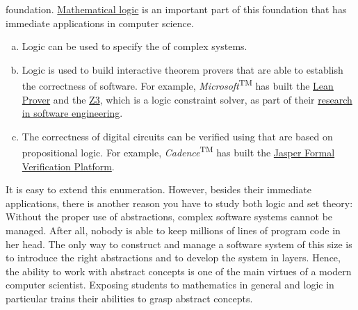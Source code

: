 foundation.  \href{https://en.wikipedia.org/wiki/Mathematical_logic}{Mathematical logic} 
is an important part of this foundation that has immediate applications in computer science. 
\begin{enumerate}[(a)]
\item Logic can be used to specify the  of complex systems.  
\item Logic is used to build interactive theorem provers that are able to establish the correctness of
      software.  For example, \textsl{Microsoft}\textsuperscript{TM} has built the
      \href{https://leanprover.github.io}{Lean Prover} and the
      \href{https://www.microsoft.com/en-us/research/project/z3-3/}{Z3}, which is a logic constraint solver, as
      part of their 
      \href{https://www.microsoft.com/en-us/research/group/research-software-engineering-rise/}{research in
        software engineering}. 
\item The correctness of digital circuits can be verified using  that are based on
      propositional logic.  For example, \textsl{Cadence}\textsuperscript{TM} has built the
      \href{https://www.cadence.com/en_US/home/tools/system-design-and-verification/formal-and-static-verification.html}{Jasper
        Formal Verification Platform}.
\end{enumerate}
It is easy to extend this enumeration.  However, besides their immediate applications, 
there is another reason you have to study both logic and set theory: Without the proper use of
{\color{blue}abstractions}, complex software systems cannot be managed.  After all, nobody is able to keep
millions of lines of program code in her head.  The only way to construct and manage a software system of this
size is to introduce the right abstractions and to develop the system in layers.  Hence, the ability
to work with abstract concepts is one of the main virtues of a modern computer scientist.  
Exposing students to mathematics in general and logic in particular trains their abilities to grasp abstract concepts.

